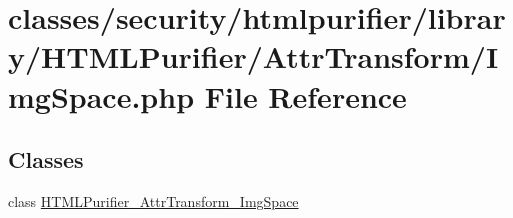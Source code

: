 \hypertarget{ImgSpace_8php}{\section{classes/security/htmlpurifier/library/\+H\+T\+M\+L\+Purifier/\+Attr\+Transform/\+Img\+Space.php File Reference}
\label{ImgSpace_8php}
}
\subsection*{Classes}
\begin{DoxyCompactItemize}
\item 
class \hyperlink{classHTMLPurifier__AttrTransform__ImgSpace}{H\+T\+M\+L\+Purifier\+\_\+\+Attr\+Transform\+\_\+\+Img\+Space}
\end{DoxyCompactItemize}
